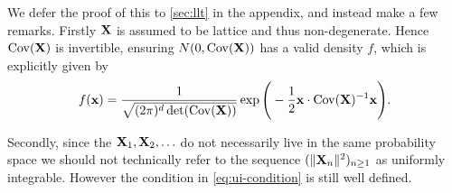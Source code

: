 We defer the proof of this to \cref{sec:llt} in the appendix, and instead make a few remarks. Firstly ${\mathbf X}$ is assumed to be lattice and thus non-degenerate. Hence $\operatorname{Cov}({\mathbf X})$ is invertible, ensuring $N(0, \operatorname{Cov}({\mathbf X}))$ has a valid density $f$, which is explicitly given by
\begin{equation*}
    f({\mathbf x}) = \frac{1}{\sqrt{(2 \pi)^d \det(\operatorname{Cov}({\mathbf X}))}}
    \exp \Bigg(
        -\frac{1}{2} {\mathbf x} \cdot \operatorname{Cov}({\mathbf X})^{-1} {\mathbf x}
        \Bigg).
\end{equation*}

Secondly, since the ${\mathbf X}_1, {\mathbf X}_2, \ldots$ do not necessarily live in the same probability space we should not technically refer to the sequence $(\lVert{\mathbf X}_n\rVert^2)_{n \geq 1}$ as uniformly integrable. However the condition in \cref{eq:ui-condition} is still well defined.

